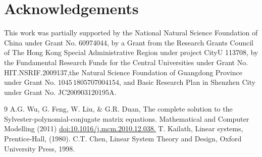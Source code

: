 \documentclass[12pt,a4paper,fleqn,twoside]{article}
\theoremstyle{plain}
\begin{document}
	\section*{ Acknowledgements}
	This work was partially supported by the National Natural Science Foundation of China under Grant No. 60974044, by a Grant from the Research Grants Council of The Hong Kong Special Administrative Region under project CityU 113708, by the Fundamental Research Funds for the Central Universities under Grant No. HIT.NSRIF.2009137,the Natural Science Foundation of Guangdong Province under Grant No. $1045\,1805707004154$, and Basic Research Plan in Shenzhen City under Grant No. JC200903120195A. 
	\begin{thebibliography}{9}
		{\footnotesize
		 A.G. Wu, G. Feng,  W. Liu, \& G.R. Duan, The complete solution to the Sylvester-polynomial-conjugate matrix equations. Mathematical and Computer Modelling (2011) \href{https://doi.org/10.1016/j.mcm.2010.12.038}{doi:10.1016/j.mcm.2010.12.038.}
		 T. Kailath, Linear systems, Prentice-Hall, (1980).
		 C.T. Chen, Linear System Theory and Design, Oxford University Press, 1998.}
	\end{thebibliography}
	
\end{document}
